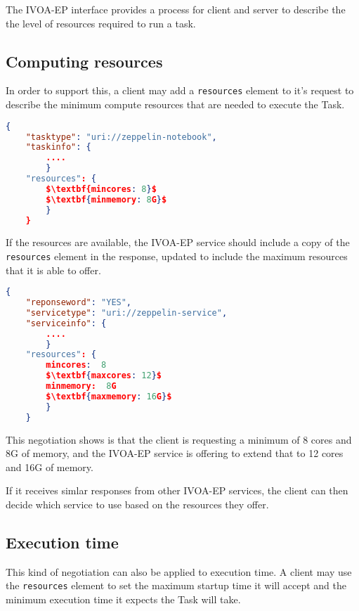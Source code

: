 \documentclass[11pt,a4paper]{ivoa}
\newcommand{\ivoep} {IVOA-EP\xspace}
\newcommand{\codeword}[1] {\texttt{#1}}
\begin{document}
The \ivoep interface provides a process for client and server to describe the
the level of resources required to run a task.

\subsection{Computing resources}
\label{sec:computing-resources}

In order to support this, a client may add a \codeword{resources} element to it's request to describe the minimum compute resources that are needed to execute the Task.

\begin{lstlisting}[language=json, mathescape=true]
    {
    "tasktype": "uri://zeppelin-notebook",
    "taskinfo": {
        ....
        }
    "resources": {
        $\textbf{mincores: 8}$
        $\textbf{minmemory: 8G}$
        }
    }
\end{lstlisting}

If the resources are available, the \ivoep service should include a copy of the \codeword{resources} element in the  response, updated to include the maximum resources that it is able to offer.

\begin{lstlisting}[language=json, mathescape=true]
    {
    "reponseword": "YES",
    "servicetype": "uri://zeppelin-service",
    "serviceinfo": {
        ....
        }
    "resources": {
        mincores:  8
        $\textbf{maxcores: 12}$
        minmemory:  8G
        $\textbf{maxmemory: 16G}$
        }
    }
\end{lstlisting}

This negotiation shows is that the client is requesting a minimum of 8 cores and 8G of memory,
and the \ivoep service is offering to extend that to 12 cores and 16G of memory.

If it receives simlar responses from other \ivoep services, the client can then decide which
service to use based on the resources they offer.

\subsection{Execution time}
\label{sec:execution-time}

This kind of negotiation can also be applied to execution time.
A client may use the \codeword{resources} element to set the maximum startup time it will accept and the minimum execution time it expects the Task will take.
\end{document}
